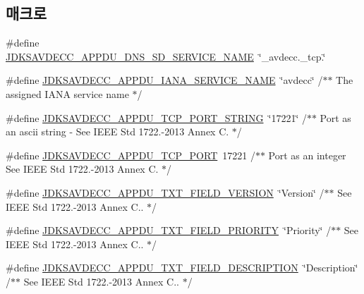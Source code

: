 \subsection*{매크로}
\begin{DoxyCompactItemize}
\item 
\#define \hyperlink{group__appdu__dns__sd_ga8177700a51c4e478e1e98d450407fafd}{J\+D\+K\+S\+A\+V\+D\+E\+C\+C\+\_\+\+A\+P\+P\+D\+U\+\_\+\+D\+N\+S\+\_\+\+S\+D\+\_\+\+S\+E\+R\+V\+I\+C\+E\+\_\+\+N\+A\+ME}~\char`\"{}\+\_\+avdecc.\+\_\+tcp.\char`\"{}
\item 
\#define \hyperlink{group__appdu__dns__sd_ga629a55b79097fc2be04157accc4ce904}{J\+D\+K\+S\+A\+V\+D\+E\+C\+C\+\_\+\+A\+P\+P\+D\+U\+\_\+\+I\+A\+N\+A\+\_\+\+S\+E\+R\+V\+I\+C\+E\+\_\+\+N\+A\+ME}~\char`\"{}avdecc\char`\"{}            /$\ast$$\ast$ The assigned I\+A\+NA service name $\ast$/
\item 
\#define \hyperlink{group__appdu__dns__sd_gac8768f9411e20f54fe1aa5deb425c5ba}{J\+D\+K\+S\+A\+V\+D\+E\+C\+C\+\_\+\+A\+P\+P\+D\+U\+\_\+\+T\+C\+P\+\_\+\+P\+O\+R\+T\+\_\+\+S\+T\+R\+I\+NG}~\char`\"{}17221\char`\"{}               /$\ast$$\ast$ Port as an ascii string -\/ See I\+E\+EE Std 1722.-\/2013 Annex C. $\ast$/
\item 
\#define \hyperlink{group__appdu__dns__sd_gadd595c1c43b5061edf06104de436a50c}{J\+D\+K\+S\+A\+V\+D\+E\+C\+C\+\_\+\+A\+P\+P\+D\+U\+\_\+\+T\+C\+P\+\_\+\+P\+O\+RT}~17221                        /$\ast$$\ast$ Port as an integer See I\+E\+EE Std 1722.-\/2013 Annex C. $\ast$/
\item 
\#define \hyperlink{group__appdu__dns__sd_ga945b7fe98ed8cd9840bd7d4d3875a427}{J\+D\+K\+S\+A\+V\+D\+E\+C\+C\+\_\+\+A\+P\+P\+D\+U\+\_\+\+T\+X\+T\+\_\+\+F\+I\+E\+L\+D\+\_\+\+V\+E\+R\+S\+I\+ON}~\char`\"{}Version\char`\"{}           /$\ast$$\ast$ See I\+E\+EE Std 1722.-\/2013 Annex C.. $\ast$/
\item 
\#define \hyperlink{group__appdu__dns__sd_ga20210462978a72b419b9407101d8ab65}{J\+D\+K\+S\+A\+V\+D\+E\+C\+C\+\_\+\+A\+P\+P\+D\+U\+\_\+\+T\+X\+T\+\_\+\+F\+I\+E\+L\+D\+\_\+\+P\+R\+I\+O\+R\+I\+TY}~\char`\"{}Priority\char`\"{}         /$\ast$$\ast$ See I\+E\+EE Std 1722.-\/2013 Annex C.. $\ast$/
\item 
\#define \hyperlink{group__appdu__dns__sd_ga26d19befe4bf522403265aa1cc00e4e4}{J\+D\+K\+S\+A\+V\+D\+E\+C\+C\+\_\+\+A\+P\+P\+D\+U\+\_\+\+T\+X\+T\+\_\+\+F\+I\+E\+L\+D\+\_\+\+D\+E\+S\+C\+R\+I\+P\+T\+I\+ON}~\char`\"{}Description\char`\"{}   /$\ast$$\ast$ See I\+E\+EE Std 1722.-\/2013 Annex C.. $\ast$/

\end{DoxyCompactItemize}
